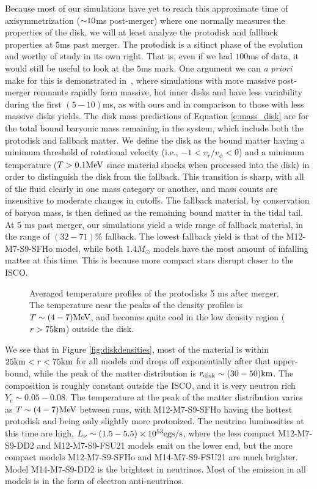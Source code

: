 Because most of our simulations have yet to reach this approximate time of axisymmetrization ($\mathord{\sim} 10$ms post-merger) where one normally measures the properties of the disk, we will at least analyze the protodisk and fallback properties at $5$ms past merger.
The protodisk is a sitinct phase of the evolution and worthy of study in its own right.  
That is, even if we had $100$ms of data, it would still be useful to look at the $5$ms mark.
One argument we can \textit{a priori} make for this is demonstrated in~\cite{Foucart:2014nda}, where simulations with more massive post-merger remnants rapidly form massive, hot inner disks and have less variability during the first $(5-10)$ms, as with ours and in comparison to those with less massive disks yields.
The disk mass predictions of Equation \ref{e:mass_disk} are for the total bound baryonic mass remaining in the system, which include both the protodisk and fallback matter.
We define the disk as the bound matter having a minimum threshold of rotational velocity (i.e., $-1 < v_r/v_\phi < 0$) and a minimum temperature ($T>0.1 {\rm MeV}$ since material shocks when processed into the disk) in order to distinguish the disk from the fallback.
This transition is sharp, with all of the fluid clearly in one mass category or another, and mass counts are insensitive to moderate changes in cutoffs.
The fallback material, by conservation of baryon mass, is then defined as the  remaining bound matter in the tidal tail.
At 5 ms past merger, our simulations yield a wide range of fallback material, in the range of $(32 - 71)\%$ fallback.  
The lowest fallback yield is that of the M12-M7-S9-SFHo model, while both $1.4 M_\odot$ models have the most amount of infalling matter at this time.
This is because more compact stars disrupt closer to the ISCO.

\begin{figure}
	\centering
	
	\caption[Temperature profiles of the protodisks 5 ms after merger]{
		Averaged temperature profiles of the protodisks 5 ms after merger.  The temperature near the peaks of the density profiles is $T \sim (4-7) {\rm MeV}$, and becomes quite cool in the low density region ($r>75 {\rm km}$) outside the disk.  
	}
	\label{fig:disktemps}
\end{figure}

We see that in Figure \ref{fig:diskdensities}, most of the material is within 
$25 {\rm km} < r < 75{\rm km}$ for all models and drops off exponentially after that upper-bound, while the peak of the matter distribution is $r _{\rm disk} \sim (30 - 50) {\rm km}$.  
The composition is roughly constant outside the ISCO, and it is very neutron rich $Y_e \sim 0.05 - 0.08$.  The temperature at the peak of the matter distribution varies as $T \sim (4-7) {\rm MeV}$ between runs, with M12-M7-S9-SFHo having the hottest protodisk and being only slightly more protonized. 
The neutrino luminosities at this time are high, $L_\nu \sim (1.5 - 5.5) \times 10^{53} {\rm egs/s}$, where the less compact M12-M7-S9-DD2 and M12-M7-S9-FSU21 models emit on the lower end, but the more compact models M12-M7-S9-SFHo  and M14-M7-S9-FSU21 are much brighter.
Model M14-M7-S9-DD2 is the brightest in neutrinos.
Most of the emission in all models is in the form of electron anti-neutrinos.


